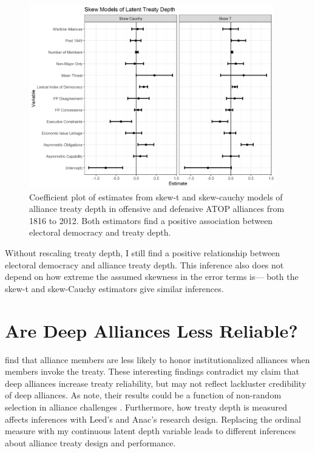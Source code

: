 \documentclass[12pt]{article}
\begin{document}
\begin{figure}[htbp]
	\centering
		\includegraphics[width=0.95\textwidth]{skew-model-res.png}
	\caption{Coefficient plot of estimates from skew-t and skew-cauchy models of alliance treaty depth in offensive and defensive ATOP alliances from 1816 to 2012. Both estimators find a positive association between electoral democracy and treaty depth.}
	\label{fig:skew-model-res}
\end{figure} 


Without rescaling treaty depth, I still find a positive relationship between electoral democracy and alliance treaty depth. 
This inference also does not depend on how extreme the assumed skewness in the error terms is--- both the skew-t and skew-Cauchy estimators give similar inferences.  





\section{Are Deep Alliances Less Reliable?} 


\citet{LeedsAnac2005} find that alliance members are less likely to honor institutionalized alliances when members invoke the treaty.
These interesting findings contradict my claim that deep alliances increase treaty reliability, but may not reflect lackluster credibility of deep alliances. 
As \citet[pg. 198]{LeedsAnac2005} note, their results could be a function of non-random selection in alliance challenges \citep{Smith1995}. 
Furthermore, how treaty depth is measured affects inferences with Leed's and Anac's research design.
Replacing the ordinal measure with my continuous latent depth variable leads to different inferences about alliance treaty design and performance. 
\end{document}
